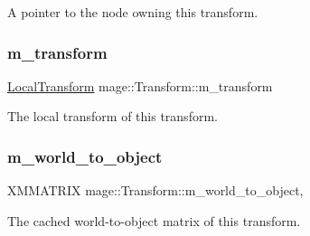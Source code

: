 A pointer to the node owning this transform. \hypertarget{classmage_1_1_transform_ab3d4fe66cef3bad3f3d335e497c3d769}{}\label{classmage_1_1_transform_ab3d4fe66cef3bad3f3d335e497c3d769} 
\subsubsection{\texorpdfstring{m\+\_\+transform}{m\_transform}}
{\footnotesize\ttfamily \hyperlink{classmage_1_1_local_transform}{Local\+Transform} mage\+::\+Transform\+::m\+\_\+transform\hspace{0.3cm}{\ttfamily [private]}}

The local transform of this transform. \hypertarget{classmage_1_1_transform_a873fefd93a3c1ca938e2bbecdbc5b3ac}{}\label{classmage_1_1_transform_a873fefd93a3c1ca938e2bbecdbc5b3ac} 
\subsubsection{\texorpdfstring{m\+\_\+world\+\_\+to\+\_\+object}{m\_world\_to\_object}}
{\footnotesize\ttfamily X\+M\+M\+A\+T\+R\+IX mage\+::\+Transform\+::m\+\_\+world\+\_\+to\+\_\+object\hspace{0.3cm}{\ttfamily [mutable]}, {\ttfamily [private]}}

The cached world-\/to-\/object matrix of this transform. 